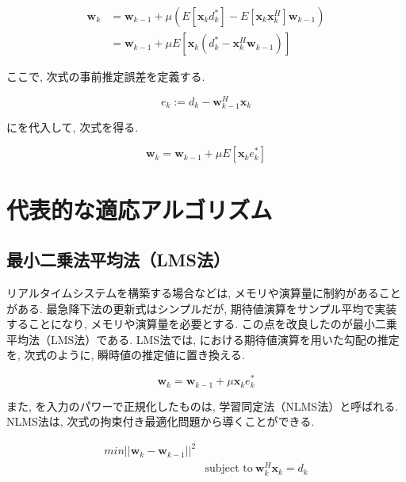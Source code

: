 \begin{equation}
\begin{split}
\bm{w}_k &= \bm{w}_{k-1} + \mu (E[\bm{x}_k d_k^*] - E[\bm{x}_k \bm{x}_k^H] \bm{w}_{k-1}) \\
         &= \bm{w}_{k-1} + \mu E[\bm{x}_k (d_k^* - \bm{x}_k^H \bm{w}_{k-1})]
\end{split}
\label{equ:w_complex}
\end{equation}

ここで, 次式の事前推定誤差を定義する. 

\begin{equation}
e_k := d_k - \bm{w}_{k-1}^H \bm{x}_k
\label{equ:prior_estimation_error}
\end{equation}

にを代入して, 次式を得る\cite{signal_processing_for_array}. 

\begin{equation}
\bm{w}_k = \bm{w}_{k-1} + \mu E[\bm{x}_k e_k^*]
\label{equ:w_update_sd}
\end{equation}


\section{代表的な適応アルゴリズム}\label{main-algo}

\subsection{最小二乗法平均法（LMS法）}\label{lms}

リアルタイムシステムを構築する場合などは, メモリや演算量に制約があることがある. 最急降下法の更新式はシンプルだが, 期待値演算をサンプル平均で実装することになり, メモリや演算量を必要とする. この点を改良したのが最小二乗平均法（LMS法）である. LMS法では, における期待値演算を用いた勾配の推定を, 次式のように, 瞬時値の推定値に置き換える. 

\begin{equation}
\bm{w}_k = \bm{w}_{k-1} + \mu \bm{x}_k e_k^*
\label{equ:w_update_lms_simple}
\end{equation}

また, を入力のパワーで正規化したものは, 学習同定法（NLMS法）と呼ばれる. NLMS法は, 次式の拘束付き最適化問題から導くことができる. 

\begin{equation}
\begin{split}
min ||\bm{w}_k - \bm{w}_{k-1}||^2 \\
& \mbox{subject \ to} \ \bm{w}_k^H \bm{x}_k = d_k
\end{split}
\end{equation}

